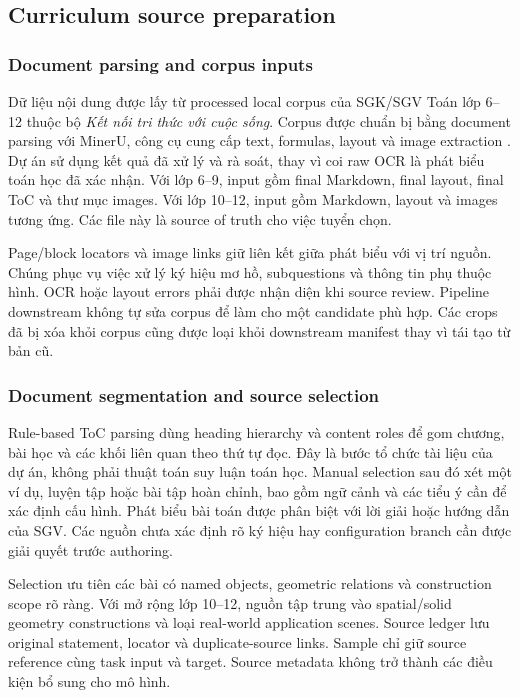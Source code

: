 \documentclass[a4paper,12pt]{article}
\begin{document}
\subsection{Curriculum source preparation}
\subsubsection{Document parsing and corpus inputs}
\label{sec:document-parsing}
Dữ liệu nội dung được lấy từ processed local corpus của SGK/SGV Toán lớp 6--12 thuộc bộ \emph{Kết nối tri thức với cuộc sống}. Corpus được chuẩn bị bằng document parsing với MinerU, công cụ cung cấp text, formulas, layout và image extraction \cite{mineru}. Dự án sử dụng kết quả đã xử lý và rà soát, thay vì coi raw OCR là phát biểu toán học đã xác nhận. Với lớp 6--9, input gồm final Markdown, final layout, final ToC và thư mục images. Với lớp 10--12, input gồm Markdown, layout và images tương ứng. Các file này là source of truth cho việc tuyển chọn.

Page/block locators và image links giữ liên kết giữa phát biểu với vị trí nguồn. Chúng phục vụ việc xử lý ký hiệu mơ hồ, subquestions và thông tin phụ thuộc hình. OCR hoặc layout errors phải được nhận diện khi source review. Pipeline downstream không tự sửa corpus để làm cho một candidate phù hợp. Các crops đã bị xóa khỏi corpus cũng được loại khỏi downstream manifest thay vì tái tạo từ bản cũ.

\subsubsection{Document segmentation and source selection}
\label{sec:problem-extraction}
Rule-based ToC parsing dùng heading hierarchy và content roles để gom chương, bài học và các khối liên quan theo thứ tự đọc. Đây là bước tổ chức tài liệu của dự án, không phải thuật toán suy luận toán học. Manual selection sau đó xét một ví dụ, luyện tập hoặc bài tập hoàn chỉnh, bao gồm ngữ cảnh và các tiểu ý cần để xác định cấu hình. Phát biểu bài toán được phân biệt với lời giải hoặc hướng dẫn của SGV. Các nguồn chưa xác định rõ ký hiệu hay configuration branch cần được giải quyết trước authoring.

Selection ưu tiên các bài có named objects, geometric relations và construction scope rõ ràng. Với mở rộng lớp 10--12, nguồn tập trung vào spatial/solid geometry constructions và loại real-world application scenes. Source ledger lưu original statement, locator và duplicate-source links. Sample chỉ giữ source reference cùng task input và target. Source metadata không trở thành các điều kiện bổ sung cho mô hình.
\end{document}
